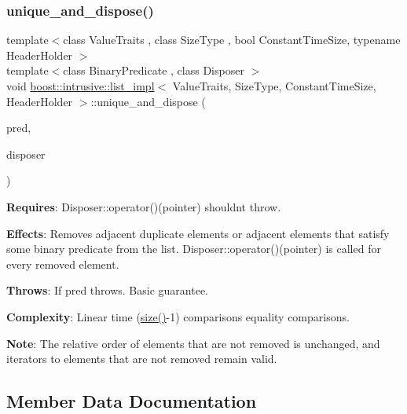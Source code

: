 \subsubsection{\texorpdfstring{unique\+\_\+and\+\_\+dispose()}{unique\_and\_dispose()}\hspace{0.1cm}{\footnotesize\ttfamily [2/2]}}
{\footnotesize\ttfamily template$<$class Value\+Traits , class Size\+Type , bool Constant\+Time\+Size, typename Header\+Holder $>$ \\
template$<$class Binary\+Predicate , class Disposer $>$ \\
void \hyperlink{classboost_1_1intrusive_1_1list__impl}{boost\+::intrusive\+::list\+\_\+impl}$<$ Value\+Traits, Size\+Type, Constant\+Time\+Size, Header\+Holder $>$\+::unique\+\_\+and\+\_\+dispose (\begin{DoxyParamCaption}\item[{Binary\+Predicate}]{pred,  }\item[{Disposer}]{disposer }\end{DoxyParamCaption})\hspace{0.3cm}{\ttfamily [inline]}}

{\bfseries Requires}\+: Disposer\+::operator()(pointer) shouldn\textquotesingle{}t throw.

{\bfseries Effects}\+: Removes adjacent duplicate elements or adjacent elements that satisfy some binary predicate from the list. Disposer\+::operator()(pointer) is called for every removed element.

{\bfseries Throws}\+: If pred throws. Basic guarantee.

{\bfseries Complexity}\+: Linear time (\hyperlink{classboost_1_1intrusive_1_1list__impl_a9da0074a31566f3a7dbc3cd1a2d752c1}{size()}-\/1) comparisons equality comparisons.

{\bfseries Note}\+: The relative order of elements that are not removed is unchanged, and iterators to elements that are not removed remain valid. 

\subsection{Member Data Documentation}
\mbox{\label{classboost_1_1intrusive_1_1list__impl_acfc0b15fa95c54830808600dd25a7472}} 
